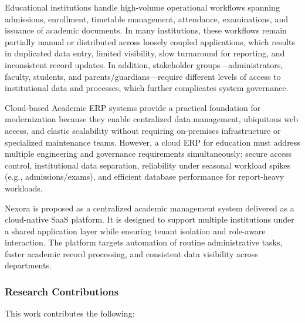 \documentclass[11pt]{article}
\begin{document}
Educational institutions handle high-volume operational workflows
spanning admissions, enrollment, timetable management, attendance,
examinations, and issuance of academic documents. In many institutions,
these workflows remain partially manual or distributed across loosely
coupled applications, which results in duplicated data entry, limited
visibility, slow turnaround for reporting, and inconsistent record
updates. In addition, stakeholder groups---administrators, faculty,
students, and parents/guardians---require different levels of access to
institutional data and processes, which further complicates system
governance.

Cloud-based Academic ERP systems provide a practical foundation for
modernization because they enable centralized data management,
ubiquitous web access, and elastic scalability without requiring
on-premises infrastructure or specialized maintenance teams. However, a
cloud ERP for education must address multiple engineering and governance
requirements simultaneously: secure access control, institutional data
separation, reliability under seasonal workload spikes (e.g.,
admissions/exams), and efficient database performance for report-heavy
workloads.

Nexora is proposed as a centralized academic management system delivered
as a cloud-native SaaS platform. It is designed to support multiple
institutions under a shared application layer while ensuring tenant
isolation and role-aware interaction. The platform targets automation of
routine administrative tasks, faster academic record processing, and
consistent data visibility across departments.

\subsubsection{Research Contributions}\label{research-contributions}

This work contributes the following:
\end{document}
